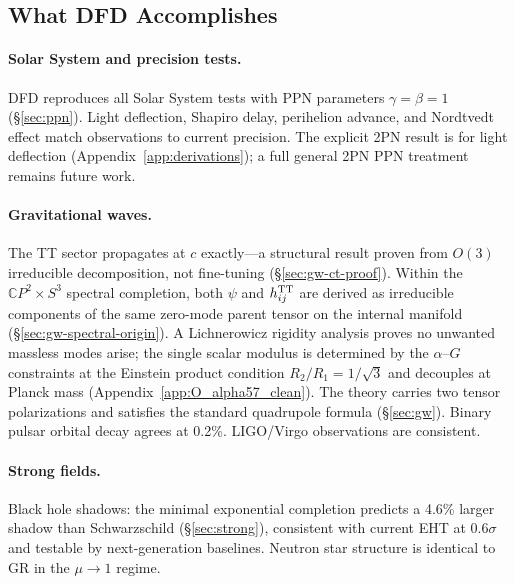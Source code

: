\subsection{What DFD Accomplishes}\label{sec:conclusions-accomplishes}

\paragraph{Solar System and precision tests.}
DFD reproduces all Solar System tests with PPN parameters $\gamma = \beta = 1$ (\S\ref{sec:ppn}). Light deflection, Shapiro delay, perihelion advance, and Nordtvedt effect match observations to current precision.  The explicit 2PN result is for light deflection (Appendix~\ref{app:derivations}); a full general 2PN PPN treatment remains future work.

\paragraph{Gravitational waves.}
The TT sector propagates at $c$ exactly---a structural result proven from $O(3)$ irreducible decomposition, not fine-tuning (\S\ref{sec:gw-ct-proof}). Within the $\mathbb{C}P^2 \times S^3$ spectral completion, both $\psi$ and $h_{ij}^{\rm TT}$ are derived as irreducible components of the same zero-mode parent tensor on the internal manifold (\S\ref{sec:gw-spectral-origin}). A Lichnerowicz rigidity analysis proves no unwanted massless modes arise; the single scalar modulus is determined by the $\alpha$--$G$ constraints at the Einstein product condition $R_2/R_1 = 1/\sqrt{3}$ and decouples at Planck mass (Appendix~\ref{app:O_alpha57_clean}). The theory carries two tensor polarizations and satisfies the standard quadrupole formula (\S\ref{sec:gw}). Binary pulsar orbital decay agrees at 0.2\%. LIGO/Virgo observations are consistent.

\paragraph{Strong fields.}
Black hole shadows: the minimal exponential completion predicts a 4.6\% larger shadow than Schwarzschild (\S\ref{sec:strong}), consistent with current EHT at $0.6\sigma$ and testable by next-generation baselines. Neutron star structure is identical to GR in the $\mu\to 1$ regime.

